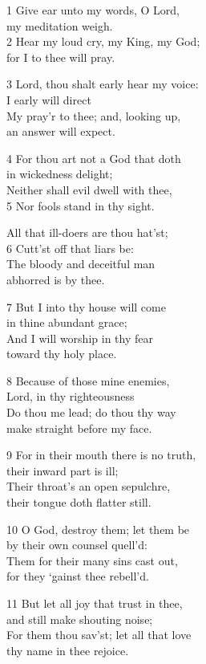 1 Give ear unto my words, O Lord,\\
my meditation weigh.\\
2 Hear my loud cry, my King, my God;\\
for I to thee will pray.

3 Lord, thou shalt early hear my voice:\\
I early will direct\\
My pray’r to thee; and, looking up,\\
an answer will expect.

4 For thou art not a God that doth\\
in wickedness delight;\\
Neither shall evil dwell with thee,\\
5 Nor fools stand in thy sight.

All that ill-doers are thou hat’st;\\
6 Cutt’st off that liars be:\\
The bloody and deceitful man\\
abhorred is by thee.

7 But I into thy house will come\\
in thine abundant grace;\\
And I will worship in thy fear\\
toward thy holy place.

8 Because of those mine enemies,\\
Lord, in thy righteousness\\
Do thou me lead; do thou thy way\\
make straight before my face.

9 For in their mouth there is no truth,\\
their inward part is ill;\\
Their throat’s an open sepulchre,\\
their tongue doth flatter still.

10 O God, destroy them; let them be\\
by their own counsel quell’d:\\
Them for their many sins cast out,\\
for they ‘gainst thee rebell’d.

11 But let all joy that trust in thee,\\
and still make shouting noise;\\
For them thou sav’st; let all that love\\
thy name in thee rejoice.

